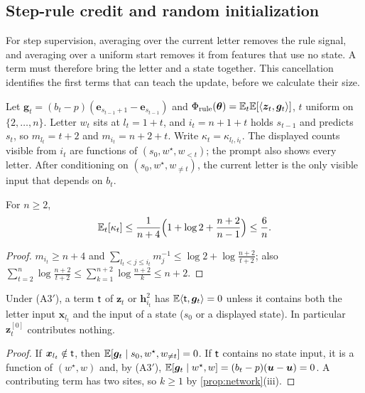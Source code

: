 \subsection{Step-rule credit and random initialization}

For step supervision, averaging over the current letter removes the rule signal, and averaging over a uniform start removes it
from features that use no state. A term must therefore bring the letter and a state together. This cancellation identifies the
first terms that can teach the update, before we calculate their size.

Let $\bm g_t=(b_t-p)(\bm e_{s_{t-1}+1}-\bm e_{s_{t-1}})$ and $\Phi_{\mathrm{rule}}(\bm\theta)=\mathbb E_t\mathbb E[\langle\bm z_t,\bm g_t\rangle]$, $t$ uniform on $\{2,\ldots,n\}$. Letter $w_t$ sits at
$l_t=1+t$, and $i_t=n+1+t$ holds $s_{t-1}$ and predicts $s_t$, so $m_{l_t}=t+2$ and $m_{i_t}=n+2+t$. Write $\kappa_t=\kappa_{l_t,i_t}$. The displayed counts visible from $i_t$
are functions of $(s_0,w^\star,w_{<t})$; the prompt also shows every letter. After conditioning on $(s_0,w^\star,w_{\ne t})$, the current letter is the
only visible input that depends on $b_t$.

\begin{lemma}
\label{lem:dilution-average}
For $n\ge2$,
\begin{equation}
 \mathbb E_t[\kappa_t]\le\frac{1}{n+4}\Bigl(1+\log2+\frac{n+2}{n-1}\Bigr)\le\frac{6}{n} .
 \label{eq:dilution-avg}
\end{equation}
\end{lemma}

\begin{proof}
$m_{i_t}\ge n+4$ and $\sum_{l_t<j\le i_t}m_j^{-1}\le\log2+\log\frac{n+2}{t+2}$; also $\sum_{t=2}^n\log\frac{n+2}{t+2}\le\sum_{k=1}^{n+2}\log\frac{n+2}{k}\le n+2$.
\end{proof}

\begin{lemma}
\label{lem:rule-sites}
Under (A3$'$), a term $\mathsf t$ of $\bm z_t$ or $\bm h^2_{i_t}$ has $\mathbb E\langle\mathsf t,\bm g_t\rangle=0$ unless it contains both the letter input $\bm x_{l_t}$ and the input of a
state ($s_0$ or a displayed state). In particular $\bm z^{[0]}_t$ contributes nothing.
\end{lemma}

\begin{proof}
If $\bm x_{l_t}\notin\mathsf t$, then $\mathbb E[\bm g_t\mid s_0,w^\star,w_{\ne t}]=0$. If $\mathsf t$ contains no state input, it is a function of $(w^\star,w)$ and, by (A3$'$),
$\mathbb E[\bm g_t\mid w^\star,w]=(b_t-p)(\bm u-\bm u)=0$. A contributing term has two sites, so $k\ge1$ by \cref{prop:network}(iii).
\end{proof}

